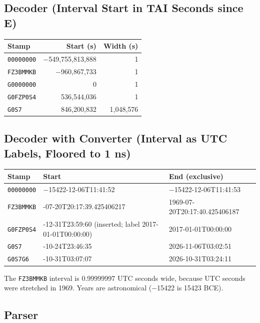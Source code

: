 \documentclass[11pt]{article}
\newcommand{\lit}[1]{\texttt{#1}}
\begin{document}
\subsection{Decoder (Interval Start in TAI Seconds since E)}

\begin{center}
\begin{tabular}{@{}lrr@{}}
\toprule
Stamp & Start (s) & Width (s) \\
\midrule
\lit{00000000} & $-$549,755,813,888 & 1 \\
\lit{FZ3BMMKB} & $-$960,867,733 & 1 \\
\lit{G0000000} & 0 & 1 \\
\lit{G0FZP0S4} & 536,544,036 & 1 \\
\lit{G0S7} & 846,200,832 & 1,048,576 \\
\bottomrule
\end{tabular}
\end{center}

\subsection{Decoder with Converter (Interval as UTC Labels, Floored to 1 ns)}

\begin{center}
\begin{tabularx}{\textwidth}{@{}l>{\raggedright\arraybackslash}Xl@{}}
\toprule
Stamp & Start & End (exclusive) \\
\midrule
\lit{00000000} & $-$15422-12-06T11:41:52 & $-$15422-12-06T11:41:53 \\
\lit{FZ3BMMKB} & 1969-07-20T20:17:39.425406217 & 1969-07-20T20:17:40.425406187 \\
\lit{G0FZP0S4} & 2016-12-31T23:59:60 (inserted; label 2017-01-01T00:00:00) & 2017-01-01T00:00:00 \\
\lit{G0S7} & 2026-10-24T23:46:35 & 2026-11-06T03:02:51 \\
\lit{G0S7G6} & 2026-10-31T03:07:07 & 2026-10-31T03:24:11 \\
\bottomrule
\end{tabularx}
\end{center}

The \lit{FZ3BMMKB} interval is 0.99999997 UTC seconds wide, because UTC seconds
were stretched in 1969. Years are astronomical ($-$15422 is 15423 BCE).

\subsection{Parser}
\end{document}
